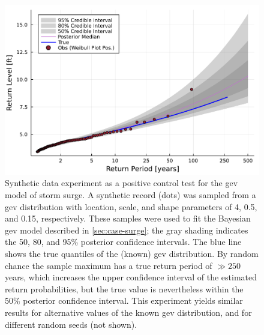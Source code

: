 \documentclass[11pt]{article}
\begin{document}
\begin{figure}
    \centering
    \includegraphics[width=\textwidth]{surge-synthetic-data-experiment}
    \caption{
        Synthetic data experiment as a positive control test for the \gls{gev} model of storm surge.
        A synthetic record (dots) was sampled from a \gls{gev} distribution with location, scale, and shape parameters of 4, 0.5, and 0.15, respectively.
        These samples were used to fit the Bayesian \gls{gev} model described in \cref{sec:case-surge}; the gray shading indicates the 50, 80, and 95\% posterior confidence intervals.
        The blue line shows the true quantiles of the (known) \gls{gev} distribution.
        By random chance the sample maximum has a true return period of $\gg 250$ years, which increases the upper confidence interval of the estimated return probabilities, but the true value is nevertheless within the 50\% posterior confidence interval.
        This experiment yields similar results for alternative values of the known \gls{gev} distribution, and for different random seeds (not shown).
    }\label{fig:surge-synthetic-data-experiment}
\end{figure}
\end{document}
